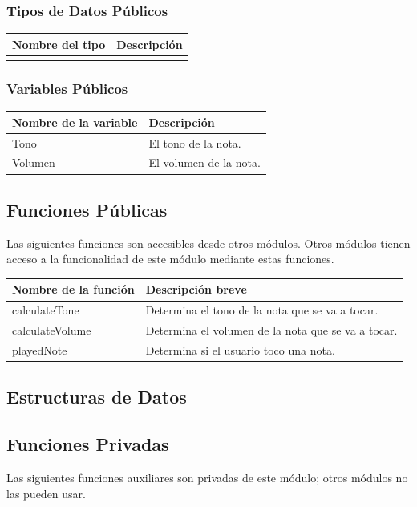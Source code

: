 \documentclass[a4paper,10pt]{article}
\begin{document}
                

\subsubsection{Tipos de Datos Públicos}
\begin{tabular}{| p{30mm} | p{10cm} |}
        \hline
        \textbf{Nombre del \mbox{tipo}} & \textbf{Descripción} \\
        \hline
         & \\
        \hline
\end{tabular}
\subsubsection{Variables Públicos}
\begin{tabular}{| p{30mm} | p{10cm} |}
        \hline
        \textbf{Nombre de la \mbox{variable}} & \textbf{Descripción} \\
        \hline
        Tono & El tono de la nota.\\
        Volumen & El volumen de la nota.\\
        \hline
\end{tabular}
\subsection{Funciones Públicas}
Las siguientes funciones son accesibles desde otros módulos. Otros módulos
tienen acceso a la funcionalidad de este módulo mediante estas funciones.
~\\

\begin{tabular}{| p{30mm} | p{10cm} |}
        \hline
        \textbf{Nombre de la \mbox{función}} & \textbf{Descripción breve} \\
        \hline
        calculateTone & Determina el tono de la nota que se va a tocar.\\
        calculateVolume & Determina el volumen de la nota que se va a tocar.\\
        playedNote & Determina si el usuario toco una nota.\\
        \hline
\end{tabular}
\subsection{Estructuras de Datos}
\subsection{Funciones Privadas}
Las siguientes funciones auxiliares son privadas de este módulo; otros módulos
no las pueden usar.
~\\
\end{document}
